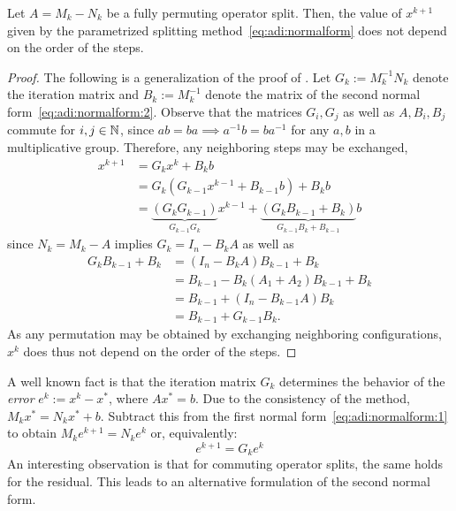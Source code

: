 \begin{proposition}
\label{thm:adi:permutation}
  Let $A = M_k - N_k$ be a fully permuting operator split.
  Then, the value of $x^{k+1}$ given by the parametrized splitting method~\eqref{eq:adi:normalform}
  does not depend on the order of the steps.
\end{proposition}
\begin{proof}
  The following is a generalization of the proof of \cite[Theorem~4.1]{Li2002}.
  Let $G_k := M_k^{-1} N_k$ denote the iteration matrix
  and $B_k := M_k^{-1}$ denote the matrix of the second normal form~\eqref{eq:adi:normalform:2}.
  Observe that the matrices $G_i, G_j$ as well as $A, B_i, B_j$ commute for $i,j\in\mathbb{N}$,
  since $ab=ba \implies a^{-1}b = ba^{-1}$ for any $a,b$ in a multiplicative group.
  Therefore, any neighboring steps may be exchanged,
  \begin{align*}
    x^{k+1}
    &= G_k x^k + B_k b \\
    &= G_k (G_{k-1} x^{k-1} + B_{k-1} b) + B_k b \\
    &= \underbrace{
      (G_k G_{k-1})
    }_{
      G_{k-1} G_k
    } x^{k-1} + \underbrace{
      (G_k B_{k-1} + B_k)
    }_{
      G_{k-1} B_k + B_{k-1}
    } b
  \end{align*}
  since $N_k = M_k - A$ implies $G_k = I_n - B_k A$ as well as
  \begin{align*}
    G_k B_{k-1} + B_k
    &= (I_n - B_k A) B_{k-1} + B_k \\
    &= B_{k-1} - B_k (A_1+A_2) B_{k-1} + B_k \\
    &= B_{k-1} + (I_n - B_{k-1} A) B_k \\
    &= B_{k-1} + G_{k-1} B_k
    .
  \end{align*}
  As any permutation may be obtained by exchanging neighboring configurations,
  $x^k$ does thus not depend on the order of the steps.
\end{proof}

A well known fact is that the iteration matrix $G_k$ determines
the behavior of the \emph{error} $e^k := x^k - x^*$, where $Ax^* = b$.
Due to the consistency of the method, $M_k x^* = N_k x^* + b$.
Subtract this from the first normal form~\eqref{eq:adi:normalform:1} to obtain
$M_k e^{k+1} = N_k e^k$ or, equivalently:
\begin{equation}
  e^{k+1} = G_k e^k
\end{equation}
An interesting observation is that for commuting operator splits,
the same holds for the residual.
This leads to an alternative formulation of the second normal form.

